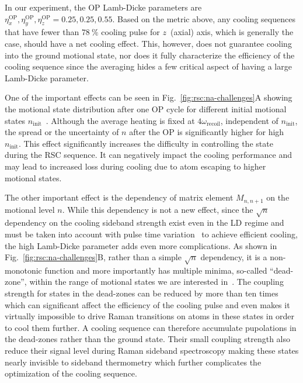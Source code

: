 In our experiment, the OP Lamb-Dicke parameters are
$\eta^{\mathrm{OP}}_x, \eta^{\mathrm{OP}}_y, \eta^{\mathrm{OP}}_z = 0.25, 0.25, 0.55$.
Based on the metric above, any cooling sequences
that have fewer than $78~\mathrm{\%}$ cooling pulse for $z$~(axial) axis,
which is generally the case, should have a net cooling effect.
This, however, does not guarantee cooling into the ground motional state,
nor does it fully characterize the efficiency of the cooling sequence
since the averaging hides a few critical aspect of having a large Lamb-Dicke parameter.

One of the important effects can be seen in Fig.~\ref{fig:rsc:na-challenges}A showing
the motional state distribution after one OP cycle
for different initial motional states $n_{\mathrm{init}}$~\cite{wineland_laser_1979}.
Although the average heating is fixed at $4\omega_{\mathrm{recoil}}$,
independent of $n_{\mathrm{init}}$,
the spread or the uncertainty of $n$ after the OP is significantly
higher for high $n_{\mathrm{init}}$.
This effect significantly increases the difficulty in controlling the state during the
RSC sequence. It can negatively impact the cooling performance and
may lead to increased loss during cooling due to atom escaping to higher motional states.

The other important effect is the dependency of matrix element $M_{n,n+1}$
on the motional level $n$.
While this dependency is not a new effect, since the $\sqrt{n}$ dependency
on the cooling sideband strength exist even in the LD regime
and must be taken into account with
pulse time variation~\cite{wineland_experimental_1998,liu_molecular_2019}
to achieve efficient cooling, the high Lamb-Dicke parameter adds even more complications.
As shown in Fig.~\ref{fig:rsc:na-challenges}B, rather than a simple $\sqrt{n}$ dependency,
it is a non-monotonic function and more importantly has multiple minima, so-called ``dead-zone'',
within the range of motional states we are interested in~\cite{wineland_laser_1979}.
The coupling strength for states in the dead-zones can be reduced by more than ten times
which can significant affect the efficiency of the cooling pulse
and even makes it virtually impossible to drive Raman transitions on atoms in these states
in order to cool them further.
A cooling sequence can therefore accumulate pupolations in the dead-zones
rather than the ground state.
Their small coupling strength also reduce their signal level during
Raman sideband spectroscopy making these states nearly invisible to sideband thermometry
which further complicates the optimization of the cooling sequence.

